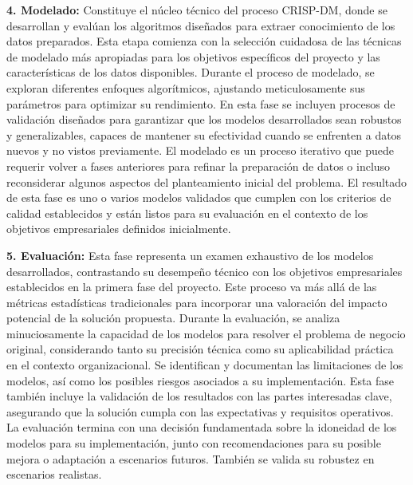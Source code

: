 \textbf{4. Modelado:} Constituye el núcleo técnico del proceso CRISP-DM, donde se desarrollan y evalúan los algoritmos diseñados para extraer conocimiento de los datos preparados. Esta etapa comienza con la selección cuidadosa de las técnicas de modelado más apropiadas para los objetivos específicos del proyecto y las características de los datos disponibles. Durante el proceso de modelado, se exploran diferentes enfoques algorítmicos, ajustando meticulosamente sus parámetros para optimizar su rendimiento. En esta fase se incluyen procesos de validación diseñados para garantizar que los modelos desarrollados sean robustos y generalizables, capaces de mantener su efectividad cuando se enfrenten a datos nuevos y no vistos previamente. El modelado es un proceso iterativo que puede requerir volver a fases anteriores para refinar la preparación de datos o incluso reconsiderar algunos aspectos del planteamiento inicial del problema. El resultado de esta fase es uno o varios modelos validados que cumplen con los criterios de calidad establecidos y están listos para su evaluación en el contexto de los objetivos empresariales definidos inicialmente.  

\textbf{5. Evaluación:} Esta fase representa un examen exhaustivo de los modelos desarrollados, contrastando su desempeño técnico con los objetivos empresariales establecidos en la primera fase del proyecto. Este proceso va más allá de las métricas estadísticas tradicionales para incorporar una valoración del impacto potencial de la solución propuesta. Durante la evaluación, se analiza minuciosamente la capacidad de los modelos para resolver el problema de negocio original, considerando tanto su precisión técnica como su aplicabilidad práctica en el contexto organizacional. Se identifican y documentan las limitaciones de los modelos, así como los posibles riesgos asociados a su implementación. Esta fase también incluye la validación de los resultados con las partes interesadas clave, asegurando que la solución cumpla con las expectativas y requisitos operativos. La evaluación termina con una decisión fundamentada sobre la idoneidad de los modelos para su implementación, junto con recomendaciones para su posible mejora o adaptación a escenarios futuros. También se valida su robustez en escenarios realistas.

